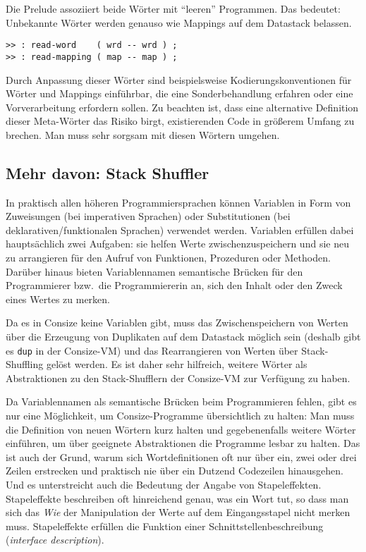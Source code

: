 Die Prelude assoziiert beide Wörter mit "`leeren"' Programmen. Das bedeutet: Unbekannte Wörter werden genauso wie Mappings auf dem Datastack belassen.

\begin{verbatim}
>> : read-word    ( wrd -- wrd ) ;
>> : read-mapping ( map -- map ) ;
\end{verbatim}

Durch Anpassung dieser Wörter sind beispielsweise Kodierungskonventionen für Wörter und Mappings einführbar, die eine Sonderbehandlung erfahren oder eine Vorverarbeitung erfordern sollen. Zu beachten ist, dass eine alternative Definition dieser Meta-Wörter das Risiko birgt, existierenden Code in größerem Umfang zu brechen. Man muss sehr sorgsam mit diesen Wörtern umgehen.

\subsection{Mehr davon: Stack Shuffler}

In praktisch allen höheren Programmiersprachen können Variablen in Form von Zuweisungen (bei imperativen Sprachen) oder Substitutionen (bei deklarativen\slash funktionalen Sprachen) verwendet werden. Variablen erfüllen dabei hauptsächlich zwei Aufgaben: sie helfen Werte zwischenzuspeichern und sie neu zu arrangieren für den Aufruf von Funktionen, Prozeduren oder Methoden. Darüber hinaus bieten Variablennamen semantische Brücken für den Programmierer bzw.\ die Programmiererin an, sich den Inhalt oder den Zweck eines Wertes zu merken.

Da es in Consize keine Variablen gibt, muss das Zwischenspeichern von Werten über die Erzeugung von Duplikaten auf dem Datastack möglich sein (deshalb gibt es \verb|dup| in der Consize-VM) und das Rearrangieren von Werten über Stack-Shuffling gelöst werden. Es ist daher sehr hilfreich, weitere Wörter als Abstraktionen zu den Stack-Shufflern der Consize-VM zur Verfügung zu haben.

Da Variablennamen als semantische Brücken beim Programmieren fehlen, gibt es nur eine Möglichkeit, um Consize-Programme übersichtlich zu halten: Man muss die Definition von neuen Wörtern kurz halten und gegebenenfalls weitere Wörter einführen, um über geeignete Abstraktionen die Programme lesbar zu halten. Das ist auch der Grund, warum sich Wortdefinitionen oft nur über ein, zwei oder drei Zeilen erstrecken und praktisch nie über ein Dutzend Codezeilen hinausgehen. Und es unterstreicht auch die Bedeutung der Angabe von Stapeleffekten. Stapeleffekte beschreiben oft hinreichend genau, was ein Wort tut, so dass man sich das \emph{Wie} der Manipulation der Werte auf dem Eingangsstapel nicht merken muss. Stapeleffekte erfüllen die Funktion einer Schnittstellenbeschreibung (\emph{interface description}).

